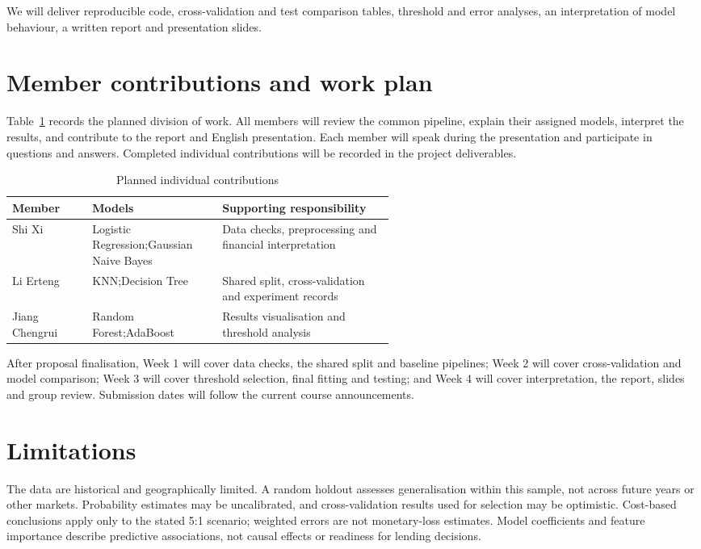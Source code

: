 \documentclass{article}
\begin{document}
We will deliver reproducible code, cross-validation and test comparison tables, threshold and error analyses, an interpretation of model behaviour, a written report and presentation slides.

\section{Member contributions and work plan}
Table~\ref{tab:contributions} records the planned division of work. All members will review the common pipeline, explain their assigned models, interpret the results, and contribute to the report and English presentation. Each member will speak during the presentation and participate in questions and answers. Completed individual contributions will be recorded in the project deliverables.

\begin{table}[htbp]
  \caption{Planned individual contributions}
  \label{tab:contributions}
  \centering
  \begin{tabularx}{\linewidth}{@{}>{\raggedright\arraybackslash}p{0.21\linewidth}>{\raggedright\arraybackslash}p{0.34\linewidth}>{\raggedright\arraybackslash}X@{}}
    \toprule
    Member & Models & Supporting responsibility \\
    \midrule
    Shi Xi & Logistic Regression;\newline Gaussian Naive Bayes & Data checks, preprocessing and financial interpretation \\
    \addlinespace
    Li Erteng & KNN;\newline Decision Tree & Shared split, cross-validation and experiment records \\
    \addlinespace
    Jiang Chengrui & Random Forest;\newline AdaBoost & Results visualisation and threshold analysis \\
    \bottomrule
  \end{tabularx}
\end{table}

After proposal finalisation, Week 1 will cover data checks, the shared split and baseline pipelines; Week 2 will cover cross-validation and model comparison; Week 3 will cover threshold selection, final fitting and testing; and Week 4 will cover interpretation, the report, slides and group review. Submission dates will follow the current course announcements.

\section{Limitations}
The data are historical and geographically limited. A random holdout assesses generalisation within this sample, not across future years or other markets. Probability estimates may be uncalibrated, and cross-validation results used for selection may be optimistic. Cost-based conclusions apply only to the stated 5:1 scenario; weighted errors are not monetary-loss estimates. Model coefficients and feature importance describe predictive associations, not causal effects or readiness for lending decisions.
\end{document}
